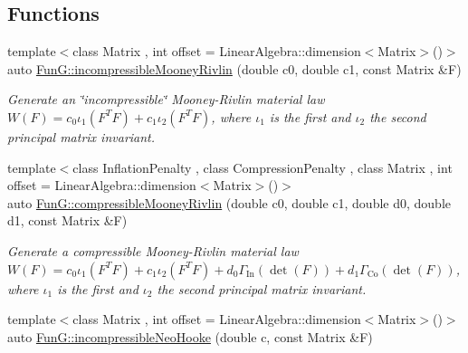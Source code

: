 \subsection*{Functions}
\begin{DoxyCompactItemize}
\item 
\hypertarget{group__Rubber_gace19173e33490aadd36ae3a03fd1d85c}{{\footnotesize template$<$class Matrix , int offset = Linear\-Algebra\-::dimension$<$\-Matrix$>$()$>$ }\\auto \hyperlink{group__Rubber_gace19173e33490aadd36ae3a03fd1d85c}{Fun\-G\-::incompressible\-Mooney\-Rivlin} (double c0, double c1, const Matrix \&F)}\label{group__Rubber_gace19173e33490aadd36ae3a03fd1d85c}

\begin{DoxyCompactList}\small\item\em Generate an \char`\"{}incompressible\char`\"{} Mooney-\/\-Rivlin material law $ W(F)=c_0\iota_1(F^T F) + c_1\iota_2(F^T F) $, where $\iota_1$ is the first and $\iota_2$ the second principal matrix invariant. \end{DoxyCompactList}\item 
\hypertarget{group__Rubber_ga9a1894daa10a0bdcc620c6c41ecb6f19}{{\footnotesize template$<$class Inflation\-Penalty , class Compression\-Penalty , class Matrix , int offset = Linear\-Algebra\-::dimension$<$\-Matrix$>$()$>$ }\\auto \hyperlink{group__Rubber_ga9a1894daa10a0bdcc620c6c41ecb6f19}{Fun\-G\-::compressible\-Mooney\-Rivlin} (double c0, double c1, double d0, double d1, const Matrix \&F)}\label{group__Rubber_ga9a1894daa10a0bdcc620c6c41ecb6f19}

\begin{DoxyCompactList}\small\item\em Generate a compressible Mooney-\/\-Rivlin material law $ W(F)=c_0\iota_1(F^T F) + c_1\iota_2(F^T F) + d_0\Gamma_\mathrm{In}(\det(F))+d_1\Gamma_\mathrm{Co}(\det(F)) $, where $\iota_1$ is the first and $\iota_2$ the second principal matrix invariant. \end{DoxyCompactList}\item 
\hypertarget{group__Rubber_ga5bb28aef7006413775791998936d6b81}{{\footnotesize template$<$class Matrix , int offset = Linear\-Algebra\-::dimension$<$\-Matrix$>$()$>$ }\\auto \hyperlink{group__Rubber_ga5bb28aef7006413775791998936d6b81}{Fun\-G\-::incompressible\-Neo\-Hooke} (double c, const Matrix \&F)}\label{group__Rubber_ga5bb28aef7006413775791998936d6b81}


\end{DoxyCompactItemize}
